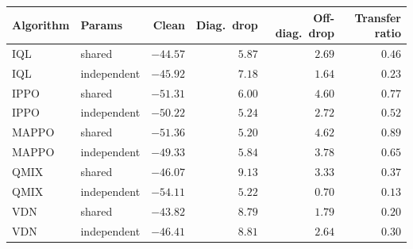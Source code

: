 \begin{tabular}{llrrrr}
\toprule
Algorithm & Params & Clean & Diag.\ drop & Off-diag.\ drop & Transfer ratio \\
\midrule
IQL & shared & $-44.57$ & $5.87$ & $2.69$ & $0.46$ \\
IQL & independent & $-45.92$ & $7.18$ & $1.64$ & $0.23$ \\
\midrule
IPPO & shared & $-51.31$ & $6.00$ & $4.60$ & $0.77$ \\
IPPO & independent & $-50.22$ & $5.24$ & $2.72$ & $0.52$ \\
\midrule
MAPPO & shared & $-51.36$ & $5.20$ & $4.62$ & $0.89$ \\
MAPPO & independent & $-49.33$ & $5.84$ & $3.78$ & $0.65$ \\
\midrule
QMIX & shared & $-46.07$ & $9.13$ & $3.33$ & $0.37$ \\
QMIX & independent & $-54.11$ & $5.22$ & $0.70$ & $0.13$ \\
\midrule
VDN & shared & $-43.82$ & $8.79$ & $1.79$ & $0.20$ \\
VDN & independent & $-46.41$ & $8.81$ & $2.64$ & $0.30$ \\
\bottomrule
\end{tabular}